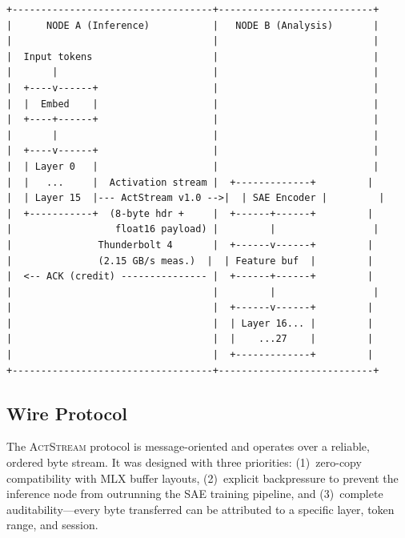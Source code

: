 \documentclass[11pt]{article}
\newcommand{\actstream}{\textsc{ActStream}}
\begin{document}
\begin{lstlisting}[style=asciiart, caption={High-level architecture of \actstream{}. Node~A runs the first $L_{\mathrm{split}}$ layers and streams activations to Node~B, which runs the SAE and the remaining layers.}, label=lst:arch]
+-----------------------------------+---------------------------+
|      NODE A (Inference)           |   NODE B (Analysis)       |
|                                   |                           |
|  Input tokens                     |                           |
|       |                           |                           |
|  +----v------+                    |                           |
|  |  Embed    |                    |                           |
|  +----+------+                    |                           |
|       |                           |                           |
|  +----v------+                    |                           |
|  | Layer 0   |                    |                           |
|  |   ...     |  Activation stream |  +-------------+         |
|  | Layer 15  |--- ActStream v1.0 -->|  | SAE Encoder |         |
|  +-----------+  (8-byte hdr +     |  +------+------+         |
|                  float16 payload) |         |                 |
|               Thunderbolt 4       |  +------v------+         |
|               (2.15 GB/s meas.)  |  | Feature buf  |         |
|  <-- ACK (credit) --------------- |  +------+------+         |
|                                   |         |                 |
|                                   |  +------v------+         |
|                                   |  | Layer 16... |         |
|                                   |  |    ...27    |         |
|                                   |  +-------------+         |
+-----------------------------------+---------------------------+
\end{lstlisting}

\subsection{Wire Protocol}
\label{sec:protocol}

The \actstream{} protocol is message-oriented and operates over a reliable, ordered byte stream. It was designed with three priorities: (1)~zero-copy compatibility with MLX buffer layouts, (2)~explicit backpressure to prevent the inference node from outrunning the SAE training pipeline, and (3)~complete auditability---every byte transferred can be attributed to a specific layer, token range, and session.
\end{document}

